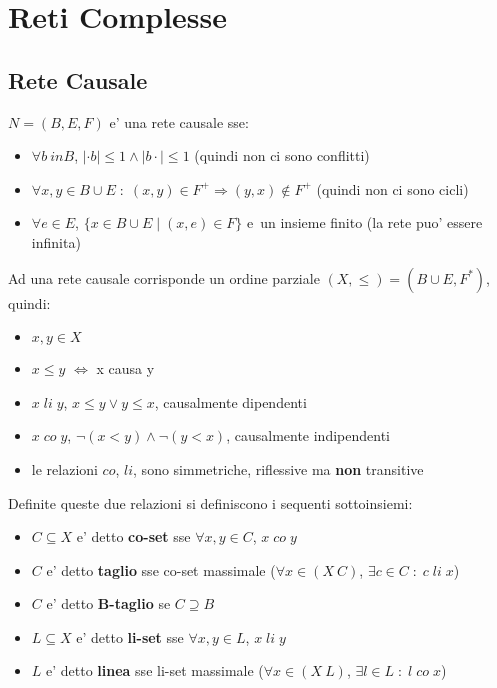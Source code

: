 \chapter{Reti Complesse}

\section{Rete Causale}

$N = (B, E, F)$ e' una rete causale sse:
\begin{itemize}
    \item $\forall b \ in B$, $|\cdot b| \leq 1 \land |b \cdot| \leq 1$ (quindi non ci sono conflitti)
    \item $\forall x,y \in B \cup E \; : \; (x, y) \in F^+ \Rightarrow (y, x) \notin F^+$ (quindi non ci sono cicli)
    \item $\forall e \in E$, $\{ x \in B \cup E \; | \; (x, e) \in F \}$ e\ un insieme finito (la rete puo' essere infinita)
\end{itemize}

Ad una rete causale corrisponde un ordine parziale $(X, \leq) = (B \cup E, F^*)$, quindi:

\begin{itemize}
    \item $x,y \in X$
    \item $x \leq y$ $\Leftrightarrow$ x causa y
    \item $x \; li \; y$, $x \leq y \lor y \leq x$, causalmente dipendenti
    \item $x \; co \; y$, $\neg (x < y) \land \neg (y < x)$, causalmente indipendenti
    \item le relazioni $co$, $li$, sono simmetriche, riflessive ma \textbf{non} transitive
\end{itemize}

Definite queste due relazioni si definiscono i sequenti sottoinsiemi:

\begin{itemize}
    \item $C \subseteq X$ e' detto \textbf{co-set} sse $\forall x,y \in C$, $x \; co \; y$
    \item $C$ e' detto \textbf{taglio} sse co-set massimale ($\forall x \in (X \ C)$, $\exists c \in C \; : \; c \; li \; x$)
    \item $C$ e' detto \textbf{B-taglio} se $C \supseteq B$
    \item $L \subseteq X$ e' detto \textbf{li-set} sse $\forall x,y \in L$, $x \; li \; y$
    \item $L$ e' detto \textbf{linea} sse li-set massimale ($\forall x \in (X \ L)$, $\exists l \in L \; : \; l \; co \; x$)
\end{itemize}


